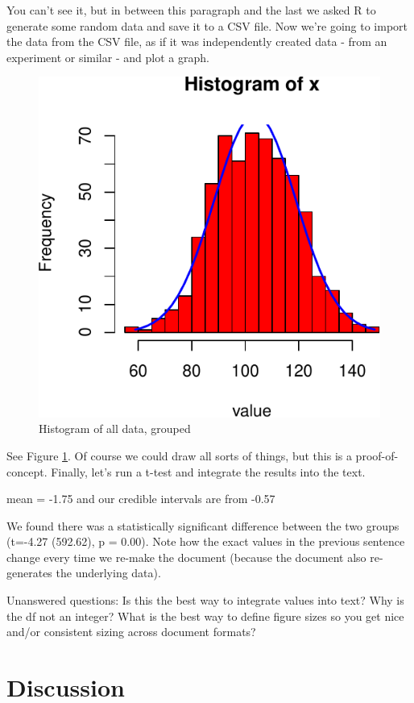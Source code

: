 \documentclass[
  english,
  ,jou,floatsintext]{apa6}
\begin{document}
You can't see it, but in between this paragraph and the last we asked R to generate some random data and save it to a CSV file. Now we're going to import the data from the CSV file, as if it was independently created data - from an experiment or similar - and plot a graph.

\begin{figure}

{\centering \includegraphics[width=0.75\linewidth]{clickbot_files/figure-latex/ourhistogram-1} 

}

\caption{Histogram of all data, grouped}\label{fig:ourhistogram}
\end{figure}

See Figure \ref{fig:ourhistogram}. Of course we could draw all sorts of things, but this is a proof-of-concept. Finally, let's run a t-test and integrate the results into the text.

mean = -1.75 and our credible intervals are from -0.57

We found there was a statistically significant difference between the two groups (t=-4.27 (592.62), p = 0.00). Note how the exact values in the previous sentence change every time we re-make the document (because the document also re-generates the underlying data).

Unanswered questions: Is this the best way to integrate values into text? Why is the df not an integer? What is the best way to define figure sizes so you get nice and/or consistent sizing across document formats?

\hypertarget{discussion}{%
\section{Discussion}\label{discussion}}
\end{document}
